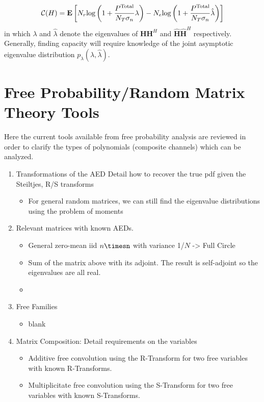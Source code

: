 \documentclass[12pt,a4paper]{report}
\begin{document}
\begin{enumerate}
\begin{gather}\label{secrecy_capacity}
\mathcal{C{}}{(H)} = \mathop{\bf E{}}\left[N_r \text{log{}}\left(1+\frac{P^{\text{Total}}}{N_T \sigma_n}\lambda \right) -
N_e \text{log{}}\left(1+\frac{P^{\text{Total}}}{N_T \sigma_n}\hat{\lambda} \right) \right]
\end{gather}
in which $\lambda$ and $\hat{\lambda}$ denote the eigenvalues of $\mathbf{H}\mathbf{H}^H$ and $\hat{\mathbf{H}}\hat{\mathbf{H}}^H$ respectively. Generally, finding capacity will require knowledge of the joint asymptotic eigenvalue distribution $p_{\lambda}(\lambda,\hat{\lambda})$.

\end{enumerate}
\section{Free Probability/Random Matrix Theory Tools}

Here the current tools available from free probability analysis are reviewed in order to clarify the types of polynomials (composite channels) which can be analyzed.
\begin{enumerate}
\item 
	Transformations of the AED
	Detail how to recover the true pdf given the Steiltjes, R/S transforms
	\begin{itemize}
	\item
		For general random matrices, we can still find the eigenvalue distributions using the problem of moments
	\end{itemize}

\item 
	Relevant matrices with known AEDs.
	\begin{itemize}
	\item General zero-mean iid $n\timesn$ with variance 1/$N$ -> Full Circle
	\item Sum of the matrix above with its adjoint. The result is self-adjoint so the eigenvalues are all real.
	\item 
	\end{itemize}
\item
	Free Families
	\begin{itemize}
	\item blank
	\end{itemize}


\item
	Matrix Composition: Detail requirements on the variables
	\begin{itemize}
	\item
	Additive free convolution using the R-Transform for two free variables with known R-Transforms.
	\item
	Multiplicitate free convolution using the S-Transform for two free variables with known S-Transforms.
	
	\end{itemize}

\end{enumerate}
\end{document}
